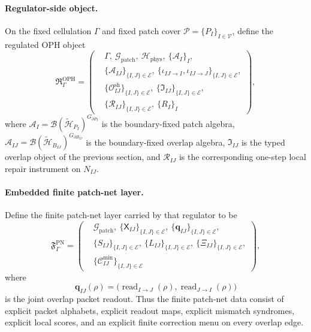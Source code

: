 \documentclass[11pt]{article}
\begin{document}
\paragraph{Regulator-side object.}
On the fixed cellulation $\Gamma$ and fixed patch cover $\mathcal P=\{P_I\}_{I\in\mathcal V}$,
define the regulated OPH object
\begin{equation}
\mathfrak R_{\Gamma}^{\mathrm{OPH}}
=
\left(
\begin{aligned}
&\Gamma,\ \mathcal G_{\mathrm{patch}},\ \mathcal H_{\mathrm{phys}},\ \{\mathcal A_I\}_I,\\
&\{\mathcal A_{IJ}\}_{\{I,J\}\in\mathcal E},
\ \{\iota_{IJ\to I},\iota_{IJ\to J}\}_{\{I,J\}\in\mathcal E},\\
&\{\mathcal O_{IJ}^{\mathrm{sh}}\}_{\{I,J\}\in\mathcal E},
\ \{\mathfrak I_{IJ}\}_{\{I,J\}\in\mathcal E},\\
&\{\mathcal R_{IJ}\}_{\{I,J\}\in\mathcal E},\ \{R_I\}_I
\end{aligned}
\right),
\end{equation}
where $\mathcal A_I=\mathcal B(\widetilde{\mathcal H}_{P_I})^{G_{\partial P_I}}$ is the
boundary-fixed patch algebra, $\mathcal A_{IJ}=\mathcal B(\widetilde{\mathcal H}_{B_{IJ}})^
{G_{\partial B_{IJ}}}$ is the boundary-fixed overlap algebra, $\mathfrak I_{IJ}$ is the typed
overlap object of the previous section, and $\mathcal R_{IJ}$ is the corresponding one-step
local repair instrument on $N_{IJ}$.

\paragraph{Embedded finite patch-net layer.}
Define the finite patch-net layer carried by that regulator to be
\begin{equation}
\mathfrak F_{\Gamma}^{\mathrm{PN}}
=
\left(
\begin{aligned}
&\mathcal G_{\mathrm{patch}},
\ \{\mathsf X_{IJ}\}_{\{I,J\}\in\mathcal E},
\ \{\mathbf q_{IJ}\}_{\{I,J\}\in\mathcal E},\\
&\{S_{IJ}\}_{\{I,J\}\in\mathcal E},
\ \{L_{IJ}\}_{\{I,J\}\in\mathcal E},
\ \{\Xi_{IJ}\}_{\{I,J\}\in\mathcal E},\\
&\{\mathcal C_{IJ}^{\mathrm{min}}\}_{\{I,J\}\in\mathcal E}
\end{aligned}
\right),
\end{equation}
where
\begin{equation}
\mathbf q_{IJ}(\rho)
=
\bigl(
\operatorname{read}_{I\to J}(\rho),
\operatorname{read}_{J\to I}(\rho)
\bigr)
\end{equation}
is the joint overlap packet readout. Thus the finite patch-net data consist of explicit packet
alphabets, explicit readout maps, explicit mismatch syndromes, explicit local scores, and an
explicit finite correction menu on every overlap edge.
\end{document}
